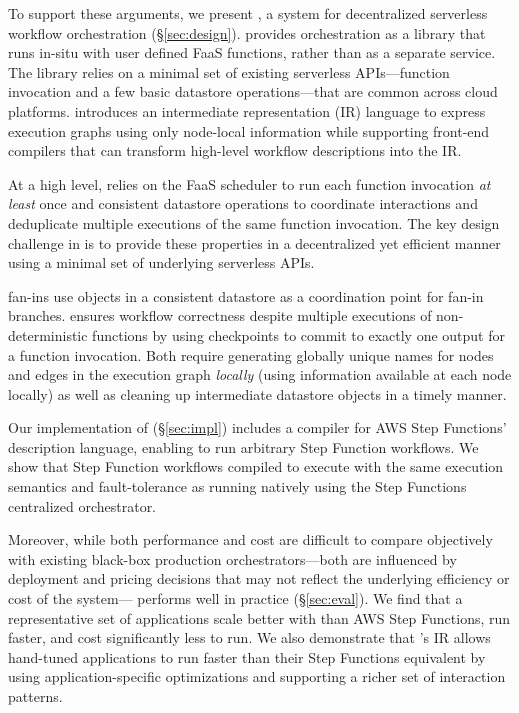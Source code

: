To support these arguments, we present \name{}, a system for decentralized
serverless workflow orchestration (\S\ref{sec:design}). \name{} provides
orchestration as a library that runs in-situ with user defined FaaS functions,
rather than as a separate service. The library relies on a minimal set of
existing serverless APIs---function invocation and a few basic datastore
operations---that are common across cloud platforms. \name{} introduces an
intermediate representation (IR) language to express execution graphs using only
node-local information while supporting front-end compilers that can transform
high-level workflow descriptions into the IR.

At a high level, \name{} relies on the FaaS scheduler to run each function
invocation \emph{at least} once and consistent datastore operations to
coordinate interactions and deduplicate multiple executions of the same function
invocation. The key design challenge in \name{} is to provide these properties
in a decentralized yet efficient manner using a minimal set of underlying
serverless APIs.

\name{} fan-ins use objects in a consistent datastore as a coordination point
for fan-in branches. \name{} ensures workflow correctness despite multiple
executions of non-deterministic functions by using checkpoints to commit to
exactly one output for a function invocation. Both require generating globally
unique names for nodes and edges in the execution graph \emph{locally} (using
information available at each node locally) as well as cleaning up intermediate
datastore objects in a timely manner.

Our implementation of \name{} (\S\ref{sec:impl}) includes a compiler for AWS Step
Functions' description language, enabling \name{} to run arbitrary Step Function
workflows.  We show that Step Function workflows compiled to \name{} execute
with the same execution semantics and fault-tolerance as running natively using
the Step Functions centralized orchestrator.

Moreover, while both performance and cost are difficult to compare objectively
with existing black-box production orchestrators---both are influenced by
deployment and pricing decisions that may not reflect the underlying efficiency
or cost of the system---\name{} performs well in practice (\S\ref{sec:eval}). We
find that a representative set of applications scale better with \name{} than
AWS Step Functions, run faster, and cost significantly less to run. We also
demonstrate that \name{}'s IR allows hand-tuned applications to run faster than
their Step Functions equivalent by using application-specific optimizations and
supporting a richer set of interaction patterns.
